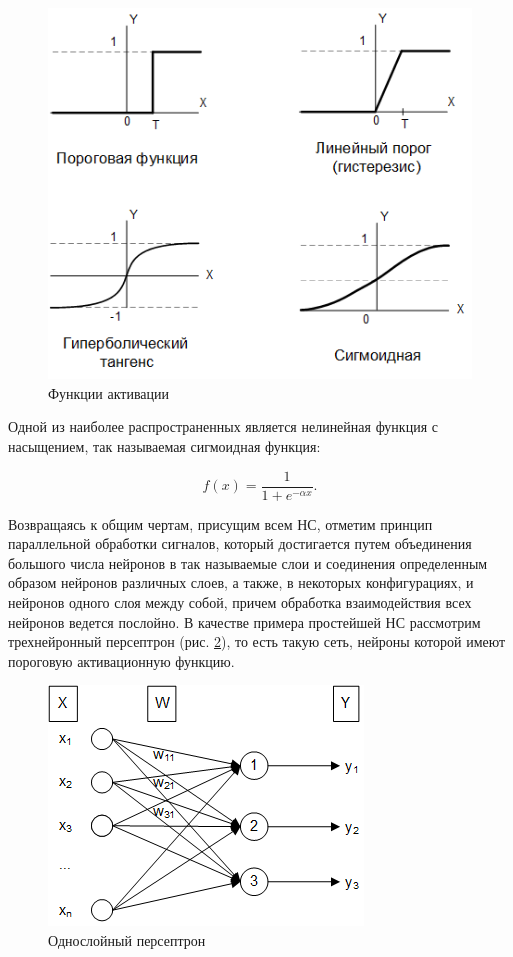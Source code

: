 \begin{figure}[H]
    \centering
    \includegraphics{images/chapter1/Функции активации нейронов.png}
    \caption{Функции активации}
    \label{fig:neuron_activation_functions}
\end{figure}

Одной из наиболее распространенных является нелинейная функция с насыщением, так называемая сигмоидная функция:

\begin{equation}
    f(x) = \frac{1}{1 + e^{-\alpha x}}.
\end{equation}

Возвращаясь к общим чертам, присущим всем НС, отметим принцип параллельной обработки сигналов, который достигается путем объединения большого числа нейронов в так называемые слои и соединения определенным образом нейронов различных слоев, а также, в некоторых конфигурациях, и нейронов одного слоя между собой, причем обработка взаимодействия всех нейронов ведется послойно. В качестве примера простейшей НС рассмотрим трехнейронный персептрон (рис. \ref{fig:neuron_3x}), то есть такую сеть, нейроны которой имеют пороговую активационную функцию.

\begin{figure}[H]
    \centering
    \includegraphics{images/chapter1/Трехнейронный персептрон.png}
    \caption{Однослойный персептрон}
    \label{fig:neuron_3x}
\end{figure}

